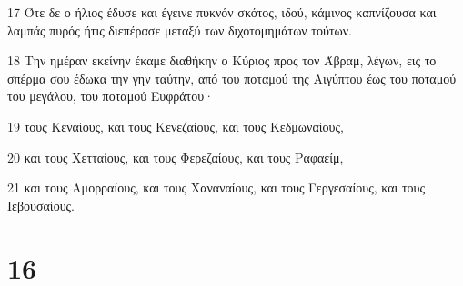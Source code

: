 \par 17 Ότε δε ο ήλιος έδυσε και έγεινε πυκνόν σκότος, ιδού, κάμινος καπνίζουσα και λαμπάς πυρός ήτις διεπέρασε μεταξύ των διχοτομημάτων τούτων.
\par 18 Την ημέραν εκείνην έκαμε διαθήκην ο Κύριος προς τον Άβραμ, λέγων, εις το σπέρμα σου έδωκα την γην ταύτην, από του ποταμού της Αιγύπτου έως του ποταμού του μεγάλου, του ποταμού Ευφράτου·
\par 19 τους Κεναίους, και τους Κενεζαίους, και τους Κεδμωναίους,
\par 20 και τους Χετταίους, και τους Φερεζαίους, και τους Ραφαείμ,
\par 21 και τους Αμορραίους, και τους Χαναναίους, και τους Γεργεσαίους, και τους Ιεβουσαίους.

\chapter{16}

